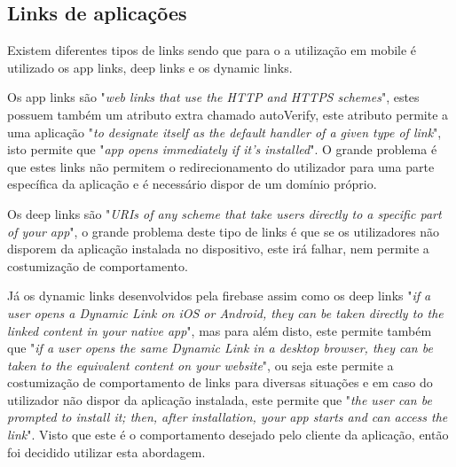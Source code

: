 \subsection{Links de aplicações}

Existem diferentes tipos de links sendo que para o a utilização em mobile é utilizado os app links, deep links e os dynamic links.

Os app links são "\emph{web links that use the HTTP and HTTPS schemes}"\citep{linking}, estes possuem também um atributo extra chamado autoVerify, este atributo permite a uma aplicação "\emph{to designate itself as the default handler of a given type of link}"\citep{linking}, isto permite que "\emph{app opens immediately if it's installed}"\citep{linking}. O grande problema é que estes links não permitem o redirecionamento do utilizador para uma parte específica da aplicação e é necessário dispor de um domínio próprio.


Os deep links são "\emph{URIs of any scheme that take users directly to a specific part of your app}"\citep{linking}, o grande problema deste tipo de links é que se os utilizadores não disporem da aplicação instalada no dispositivo, este irá falhar, nem permite a costumização de comportamento.

Já os dynamic links desenvolvidos pela firebase assim como os deep links "\emph{if a user opens a Dynamic Link on iOS or Android, they can be taken directly to the linked content in your native app}"\citep{dynamic_linking}, mas para além disto, este permite também que "\emph{if a user opens the same Dynamic Link in a desktop browser, they can be taken to the equivalent content on your website}"\citep{dynamic_linking}, ou seja este permite a costumização de comportamento de links para diversas situações e em caso do utilizador não dispor da aplicação instalada, este permite que "\emph{the user can be prompted to install it; then, after installation, your app starts and can access the link}"\citep{dynamic_linking}. Visto que este é o comportamento desejado pelo cliente da aplicação, então foi decidido utilizar esta abordagem.
